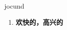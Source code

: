 
\begin{frame}
{\huge jocund}
\begin{center}
\begin{enumerate}\Large
  \item \textbf{欢快的，高兴的}
\end{enumerate}
\end{center}
\end{frame}
